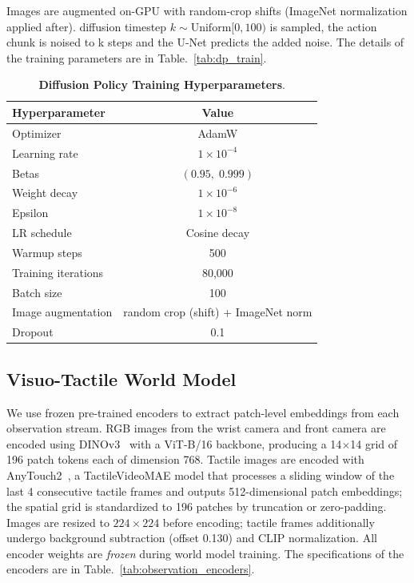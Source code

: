   Images are augmented on-GPU with random-crop shifts (ImageNet normalization applied after).
  diffusion timestep $k \sim \mathrm{Uniform}[0, 100)$ is sampled, the action chunk is noised to k steps and the U-Net predicts the added noise. The details of the training parameters are in Table.~\ref{tab:dp_train}.
  
  \begin{table}[h]
  \centering
  \caption{\textbf{Diffusion Policy Training Hyperparameters}.}
  \label{tab:dp_train}
  \begin{tabular}{lc}
  \toprule
  \textbf{Hyperparameter} & \textbf{Value} \\
  \midrule
  Optimizer               & AdamW \\
  Learning rate           & $1\times10^{-4}$ \\
  Betas                   & $(0.95,\;0.999)$ \\
  Weight decay            & $1\times10^{-6}$ \\
  Epsilon                 & $1\times10^{-8}$ \\
  LR schedule             & Cosine decay \\
  Warmup steps            & 500 \\ 
  Training iterations     & 80{,}000 \\
  Batch size              & 100 \\
  Image augmentation      & random crop (shift) + ImageNet norm \\
  Dropout                 & 0.1 \\
  \bottomrule
  \end{tabular}
\label{tab:base_policy_training}
  \end{table}
\subsection{Visuo-Tactile World Model}
\label{app:implement_visuo_tactile_world_model}
  We use frozen pre-trained encoders to extract patch-level embeddings from each observation stream.
  RGB images from the wrist camera  and front camera are encoded using
DINOv3~\cite{simeoni2025dinov3} with a ViT-B/16 backbone, producing a 14$\times$14 grid of 196 patch tokens each
  of dimension 768.
  Tactile images are encoded with AnyTouch2~\cite{fenganytouch2}, a TactileVideoMAE model
  that processes a sliding window of the last 4 consecutive tactile frames and outputs
  512-dimensional patch embeddings; the spatial grid is standardized to 196 patches by truncation or
  zero-padding.
  Images are resized to $224\times224$ before encoding; tactile frames additionally undergo
  background subtraction (offset 0.130) and CLIP normalization.
  All encoder weights are \emph{frozen} during world model training. The specifications of the encoders are in Table.~\ref{tab:observation_encoders}.

